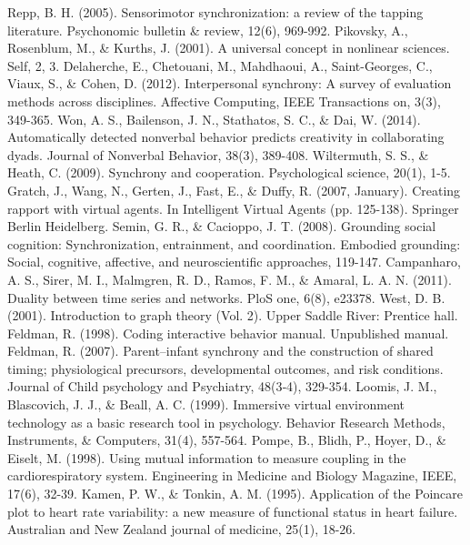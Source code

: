 \documentclass[12pt]{article}
\begin{document}
\begin{thebibliography}{}
    Repp, B. H. (2005). Sensorimotor synchronization: a review of the tapping literature. Psychonomic bulletin \& review, 12(6), 969-992.
    Pikovsky, A., Rosenblum, M., \& Kurths, J. (2001). A universal concept in nonlinear sciences. Self, 2, 3.
    Delaherche, E., Chetouani, M., Mahdhaoui, A., Saint-Georges, C., Viaux, S., \& Cohen, D. (2012). Interpersonal synchrony: A survey of evaluation methods across disciplines. Affective Computing, IEEE Transactions on, 3(3), 349-365.
    Won, A. S., Bailenson, J. N., Stathatos, S. C., \& Dai, W. (2014). Automatically detected nonverbal behavior predicts creativity in collaborating dyads. Journal of Nonverbal Behavior, 38(3), 389-408.
    Wiltermuth, S. S., \& Heath, C. (2009). Synchrony and cooperation. Psychological science, 20(1), 1-5.
    Gratch, J., Wang, N., Gerten, J., Fast, E., \& Duffy, R. (2007, January). Creating rapport with virtual agents. In Intelligent Virtual Agents (pp. 125-138). Springer Berlin Heidelberg.
    Semin, G. R., \& Cacioppo, J. T. (2008). Grounding social cognition: Synchronization, entrainment, and coordination. Embodied grounding: Social, cognitive, affective, and neuroscientific approaches, 119-147.
    Campanharo, A. S., Sirer, M. I., Malmgren, R. D., Ramos, F. M., \& Amaral, L. A. N. (2011). Duality between time series and networks. PloS one, 6(8), e23378.
    West, D. B. (2001). Introduction to graph theory (Vol. 2). Upper Saddle River: Prentice hall.
    Feldman, R. (1998). Coding interactive behavior manual. Unpublished manual.
    Feldman, R. (2007). Parent–infant synchrony and the construction of shared timing; physiological precursors, developmental outcomes, and risk conditions. Journal of Child psychology and Psychiatry, 48(3‐4), 329-354.
    Loomis, J. M., Blascovich, J. J., \& Beall, A. C. (1999). Immersive virtual environment technology as a basic research tool in psychology. Behavior Research Methods, Instruments, \& Computers, 31(4), 557-564.
    Pompe, B., Blidh, P., Hoyer, D., \& Eiselt, M. (1998). Using mutual information to measure coupling in the cardiorespiratory system. Engineering in Medicine and Biology Magazine, IEEE, 17(6), 32-39.
    Kamen, P. W., \& Tonkin, A. M. (1995). Application of the Poincare plot to heart rate variability: a new measure of functional status in heart failure. Australian and New Zealand journal of medicine, 25(1), 18-26.

\end{thebibliography}
\end{document}
